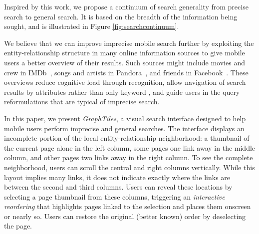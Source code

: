 Inspired by this work, we propose a continuum of search generality from precise search to general search. It is based on the breadth of the information being sought, and is illustrated in Figure \ref{fig:searchcontinuum}.

We believe that we can improve imprecise mobile search further by exploiting the entity-relationship structure in many online information sources to give mobile users a better overview of their results. Such sources might include movies and crew in IMDb~\cite{imdb}, songs and artists in Pandora~\cite{pandora}, and friends in Facebook~\cite{Facebook}. These overviews reduce cognitive load through recognition, allow navigation of search results by attributes rather than only keyword \cite{Hearst:2002}, and guide users in the query reformulations that are typical of imprecise search.

In this paper, we present \textit{GraphTiles}, a visual search interface designed to help mobile users perform imprecise and general searches. The interface displays an incomplete portion of the local entity-relationship neighborhood: a thumbnail of the current page alone in the left column, some pages one link away in the middle column, and other pages two links away in the right column. To see the complete neighborhood, users can scroll the central and right columns vertically. While this layout implies many links, it does not indicate exactly where the links are between the second and third columns. Users can reveal these locations by selecting a page thumbnail from these columns, triggering an \textit{interactive reordering} that highlights pages linked to the selection and places them onscreen or nearly so. Users can restore the original (better known) order by deselecting the page.